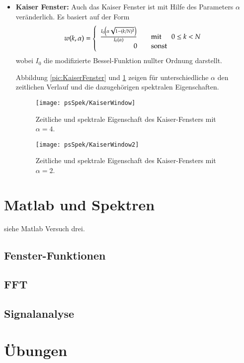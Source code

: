 \begin{itemize}
    \item {\bf Kaiser Fenster:} Auch das Kaiser Fenster ist mit Hilfe des Parameters $\alpha$
    veränderlich. Es basiert auf der Form
\begin{equation}\label{eq:Kaiser-Fenster}
   w(k,\alpha) = \left\{\begin{array}{c}
     \frac{I_0\left(\alpha \sqrt{1-(k/N)^2}\right)}{I_0 (\alpha)}     \quad \quad\mathrm{mit}\;\, \quad 0\leq k
   < N\\
     0 \quad \quad \mbox{sonst} \\
   \end{array}
   \right.
\end{equation}
wobei $I_0$ die modifizierte Bessel-Funktion nullter Ordnung darstellt.

Abbildung \ref{pic:KaiserFenster} und \ref{pic:KaiserFenster2} zeigen für
unterschiedliche $\alpha$ den zeitlichen Verlauf und die dazugehörigen spektralen Eigenschaften.
\begin{figure}[H]
\begin{center}
\texttt{[image: psSpek/KaiserWindow]}
\caption{\label{pic:KaiserFenster}Zeitliche und spektrale Eigenschaft
des Kaiser-Fensters mit $\alpha = 4$.}
\texttt{[image: psSpek/KaiserWindow2]}
\caption{\label{pic:KaiserFenster2}Zeitliche und spektrale Eigenschaft
des Kaiser-Fensters mit $\alpha = 2$.}
\end{center}
\end{figure}
\end{itemize}


{
\section{Matlab und Spektren}
siehe Matlab Versuch drei.
\subsection{Fenster-Funktionen}
\subsection{FFT}
\subsection{Signalanalyse}
}
\section{Übungen}
